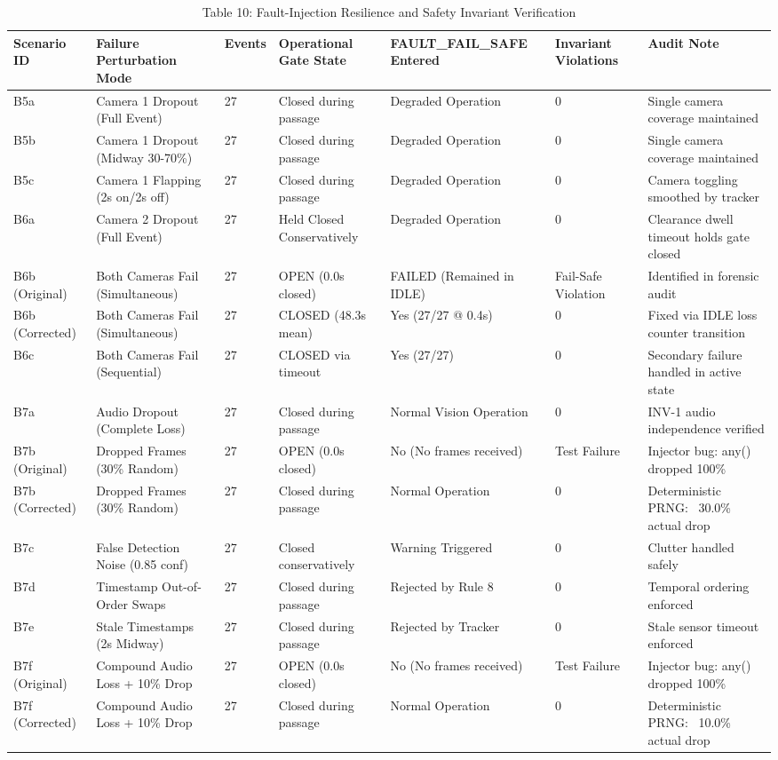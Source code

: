 \begin{table}[t]
\centering
\caption{Table 10: Fault-Injection Resilience and Safety Invariant Verification}
\label{tab:table10_failure_injection_results}
\begin{tabular}{lllllll}
\hline
Scenario ID & Failure Perturbation Mode & Events & Operational Gate State & FAULT\_FAIL\_SAFE Entered & Invariant Violations & Audit Note \\
\hline
B5a & Camera 1 Dropout (Full Event) & 27 & Closed during passage & Degraded Operation & 0 & Single camera coverage maintained \\
B5b & Camera 1 Dropout (Midway 30-70\%) & 27 & Closed during passage & Degraded Operation & 0 & Single camera coverage maintained \\
B5c & Camera 1 Flapping (2s on/2s off) & 27 & Closed during passage & Degraded Operation & 0 & Camera toggling smoothed by tracker \\
B6a & Camera 2 Dropout (Full Event) & 27 & Held Closed Conservatively & Degraded Operation & 0 & Clearance dwell timeout holds gate closed \\
B6b (Original) & Both Cameras Fail (Simultaneous) & 27 & OPEN (0.0s closed) & FAILED (Remained in IDLE) & Fail-Safe Violation & Identified in forensic audit \\
B6b (Corrected) & Both Cameras Fail (Simultaneous) & 27 & CLOSED (48.3s mean) & Yes (27/27 @ 0.4s) & 0 & Fixed via IDLE loss counter transition \\
B6c & Both Cameras Fail (Sequential) & 27 & CLOSED via timeout & Yes (27/27) & 0 & Secondary failure handled in active state \\
B7a & Audio Dropout (Complete Loss) & 27 & Closed during passage & Normal Vision Operation & 0 & INV-1 audio independence verified \\
B7b (Original) & Dropped Frames (30\% Random) & 27 & OPEN (0.0s closed) & No (No frames received) & Test Failure & Injector bug: any() dropped 100\% \\
B7b (Corrected) & Dropped Frames (30\% Random) & 27 & Closed during passage & Normal Operation & 0 & Deterministic PRNG: ~30.0\% actual drop \\
B7c & False Detection Noise (0.85 conf) & 27 & Closed conservatively & Warning Triggered & 0 & Clutter handled safely \\
B7d & Timestamp Out-of-Order Swaps & 27 & Closed during passage & Rejected by Rule 8 & 0 & Temporal ordering enforced \\
B7e & Stale Timestamps (2s Midway) & 27 & Closed during passage & Rejected by Tracker & 0 & Stale sensor timeout enforced \\
B7f (Original) & Compound Audio Loss + 10\% Drop & 27 & OPEN (0.0s closed) & No (No frames received) & Test Failure & Injector bug: any() dropped 100\% \\
B7f (Corrected) & Compound Audio Loss + 10\% Drop & 27 & Closed during passage & Normal Operation & 0 & Deterministic PRNG: ~10.0\% actual drop \\
\hline
\end{tabular}
\end{table}
